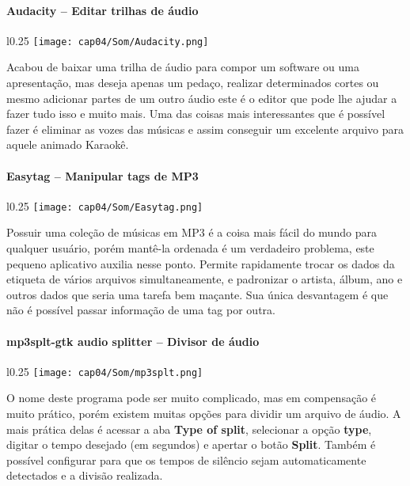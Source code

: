 \paragraph{Audacity – Editar trilhas de áudio}
\begin{minipage}{\linewidth}
 \vspace{5pt}
 \begin{wrapfigure}{l}{0.25\textwidth}
  \vspace{-\baselineskip}
  \texttt{[image: cap04/Som/Audacity.png]} 
 \end{wrapfigure}
 Acabou de baixar uma trilha de áudio para compor um software ou uma apresentação, mas deseja apenas um pedaço, realizar determinados cortes ou mesmo adicionar partes de um outro áudio este é o editor que pode lhe ajudar a fazer tudo isso e muito mais. Uma das coisas mais interessantes que é possível fazer é eliminar as vozes das músicas e assim conseguir um excelente arquivo para aquele animado Karaokê.
\end{minipage}

\paragraph{Easytag – Manipular tags de MP3}
\begin{minipage}{\linewidth}
 \vspace{5pt}
 \begin{wrapfigure}{l}{0.25\textwidth}
  \vspace{-\baselineskip}
  \texttt{[image: cap04/Som/Easytag.png]} 
 \end{wrapfigure}
 Possuir uma coleção de músicas em MP3 é a coisa mais fácil do mundo para qualquer usuário, porém mantê-la ordenada é um verdadeiro problema, este pequeno aplicativo auxilia nesse ponto. Permite rapidamente trocar os dados da etiqueta de vários arquivos simultaneamente, e padronizar o artista, álbum, ano e outros dados que seria uma tarefa bem maçante. Sua única desvantagem é que não é possível passar informação de uma tag por outra.
\end{minipage}

\paragraph{mp3splt-gtk audio splitter – Divisor de áudio}
\begin{minipage}{\linewidth}
 \vspace{5pt}
 \begin{wrapfigure}{l}{0.25\textwidth}
  \vspace{-\baselineskip}
  \texttt{[image: cap04/Som/mp3splt.png]} 
 \end{wrapfigure}
 O nome deste programa pode ser muito complicado, mas em compensação é muito prático, porém existem muitas opções para dividir um arquivo de áudio. A mais prática delas é acessar a aba \textbf{Type of split}, selecionar a opção \textbf{type}, digitar o tempo desejado (em segundos) e apertar o botão \textbf{Split}. Também é possível configurar para que os tempos de silêncio sejam automaticamente detectados e a divisão realizada.
\end{minipage}

